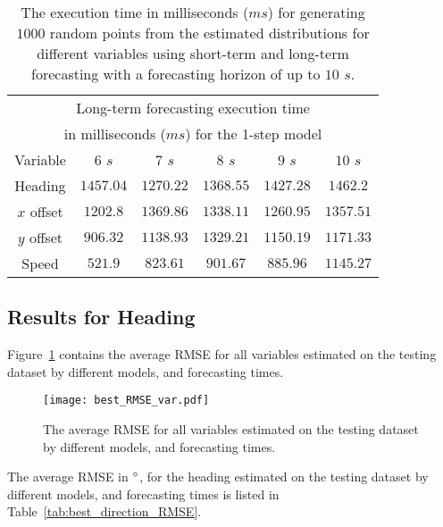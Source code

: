 \documentclass[preprint,12pt]{elsarticle}
\begin{document}
\begin{table}[!ht]
\begin{tabular}{|c|c|c|c|c|c|}
        \multicolumn{6}{|c|}{Long-term forecasting execution time} \\
        \multicolumn{6}{|c|}{in milliseconds ($ms$) for the 1-step model} \\ \hline
        Variable & $6$ $s$ & $7$ $s$ & $8$ $s$ & $9$ $s$ & $10$ $s$ \\ \hline
        Heading & $1457.04$ & $1270.22$ & $1368.55$ & $1427.28$ & $1462.2$ \\ \hline
        $x$ offset & $1202.8$ & $1369.86$ & $1338.11$ & $1260.95$ & $1357.51$ \\ \hline
        $y$ offset & $906.32$ & $1138.93$ & $1329.21$ & $1150.19$ & $1171.33$ \\ \hline
        Speed & $521.9$ & $823.61$ & $901.67$ & $885.96$ & $1145.27$ \\ \hline
    \end{tabular}
	\caption{The execution time in milliseconds ($ms$) for generating $1000$ random points from the estimated distributions for different variables using short-term and long-term forecasting with a forecasting horizon of up to $10$ $s$.}
	\label{tab:timeno}
\end{table}

\subsection{Results for Heading}

Figure~\ref{fig:best_RMSE_var} contains the average RMSE for all variables estimated on the testing dataset by different models, and forecasting times.

\begin{figure}[!ht]
	\centering
	\texttt{[image: best\_RMSE\_var.pdf]}
	\caption{The average RMSE for all variables estimated on the testing dataset by different models, and forecasting times.}
	\label{fig:best_RMSE_var}
\end{figure}

The average RMSE in $\degree$, for the heading estimated on the testing dataset by different models, and forecasting times is listed in Table~\ref{tab:best_direction_RMSE}.
\end{document}
